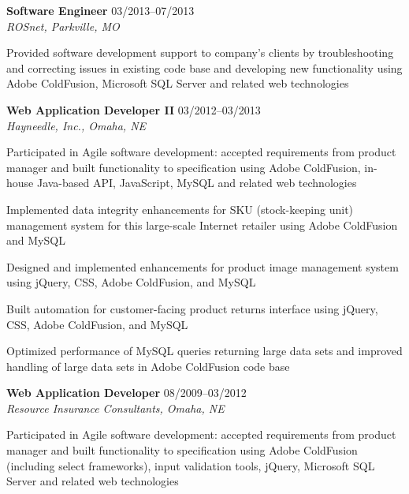 \begin{itemize1}
	\item \textbf{Software Engineer} \textopenbullet{} 03/2013--07/2013 \\
		\textit{ROSnet, Parkville, MO} \vspace{-1.5mm}
		\begin{itemize1}
			\item Provided software development support to company's clients by troubleshooting and correcting issues in existing code base and developing new functionality using Adobe ColdFusion, Microsoft SQL Server and related web technologies
		\end{itemize1}
\end{itemize1}

\begin{itemize1}
	\item \textbf{Web Application Developer II} \textopenbullet{} 03/2012--03/2013 \\
		\textit{Hayneedle, Inc., Omaha, NE} \vspace{-1.5mm}
		\begin{itemize1}
			\item Participated in Agile software development: accepted requirements from product manager and built functionality to specification using Adobe ColdFusion, in-house Java-based API, JavaScript, MySQL and related web technologies
			\item Implemented data integrity enhancements for SKU (stock-keeping unit) management system for this large-scale Internet retailer using Adobe ColdFusion and MySQL
			\item Designed and implemented enhancements for product image management system using jQuery, CSS, Adobe ColdFusion, and MySQL
			\item Built automation for customer-facing product returns interface using jQuery, CSS, Adobe ColdFusion, and MySQL
			\item Optimized performance of MySQL queries returning large data sets and improved handling of large data sets in Adobe ColdFusion code base
		\end{itemize1}
	\item \textbf{Web Application Developer} \textopenbullet{} 08/2009--03/2012 \\
		\textit{Resource Insurance Consultants, Omaha, NE} \vspace{-1.5mm}
		\begin{itemize1}
 			\item Participated in Agile software development: accepted requirements from product manager and built functionality to specification using Adobe ColdFusion (including select frameworks), input validation tools, jQuery, Microsoft SQL Server and related web technologies

\end{itemize1}
\end{itemize1}
